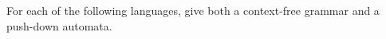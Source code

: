 \documentclass[paper=a4, fontsize=11pt]{scrartcl} %
\begin{document}
\maketitle %

\section{}

\begin{fancyquotes}
  For each of the following languages, give both a context-free
  grammar and a push-down automata.
\end{fancyquotes}
\end{document}
